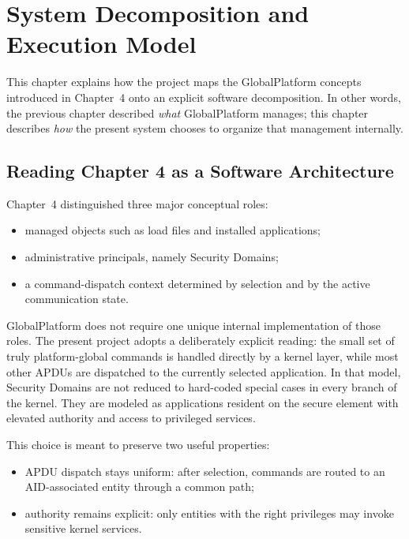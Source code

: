 \chapter{System Decomposition and Execution Model}

This chapter explains how the project maps the GlobalPlatform concepts
introduced in Chapter~4 onto an explicit software decomposition. In
other words, the previous chapter described \emph{what} GlobalPlatform
manages; this chapter describes \emph{how} the present system chooses to
organize that management internally.

\section{Reading Chapter 4 as a Software Architecture}


Chapter~4 distinguished three major conceptual roles:
\begin{itemize}
\item managed objects such as load files and installed applications;
\item administrative principals, namely Security Domains;
\item a command-dispatch context determined by selection and by the
  active communication state.
\end{itemize}

GlobalPlatform does not require one unique internal implementation of
those roles. The present project adopts a deliberately explicit reading:
the small set of truly platform-global commands is handled directly by a
kernel layer, while most other APDUs are dispatched to the currently
selected application. In that model, Security Domains are not reduced
to hard-coded special cases in every branch of the kernel. They are
modeled as applications resident on the secure element with elevated authority and access to
privileged services.

This choice is meant to preserve two useful properties:
\begin{itemize}
\item APDU dispatch stays uniform: after selection, commands are routed
  to an AID-associated entity through a common path;
\item authority remains explicit: only entities with the right
  privileges may invoke sensitive kernel services.
\end{itemize}

